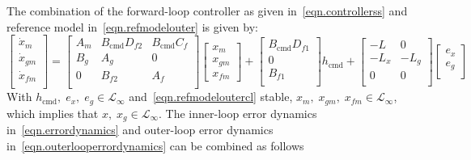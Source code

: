 \documentclass[]{../sty/aiaa-tc}
\theoremstyle{examplestyle}
\begin{document}
\begin{proof-dan}
    The combination of the forward-loop controller as given in\ \eqref{eqn.controllerss} and reference model in\ \eqref{eqn.refmodelouter} is given by:
    \begin{equation}
      \label{eqn.refmodeloutercl}
      \begin{bmatrix}
        \dot{x}_{m} \\
        \dot{x}_{gm} \\
        \dot{x}_{fm} \\
      \end{bmatrix}
      =
      \begin{bmatrix}
        A_{m} & B_{\text{cmd}}D_{f2} & B_{\text{cmd}}C_{f} \\
        B_{g} & A_{g} & 0 \\
        0 & B_{f2} & A_{f} \\
      \end{bmatrix}
      \begin{bmatrix}
        x_{m} \\
        x_{gm} \\
        x_{fm}
      \end{bmatrix}
      +
      \begin{bmatrix}
        B_{\text{cmd}}D_{f1} \\
        0 \\
        B_{f1} \\
      \end{bmatrix}
      h_{\text{cmd}}+
      \begin{bmatrix}
        -L & 0 \\
        -L_{x} & -L_{g} \\
        0 & 0 \\
      \end{bmatrix}
      \begin{bmatrix}
        e_{x} \\
        e_{g} \\
      \end{bmatrix}
    \end{equation}
    With $h_{\text{cmd}}, \; e_{x}, \; e_{g} \in\mathcal{L}_{\infty}$ and\ \eqref{eqn.refmodeloutercl} stable, $x_{m}, \; x_{gm}, \; x_{fm} \in\mathcal{L}_{\infty}$, which implies that $x, \; x_{g} \in\mathcal{L}_{\infty}$.
    The inner-loop error dynamics in\ \eqref{eqn.errordynamics} and outer-loop error dynamics in\ \eqref{eqn.outerlooperrordynamics} can be combined as follows
    \begin{equation}
      \label{eqn.combinederrordynamics}

\end{equation}
\end{proof-dan}
\end{document}

